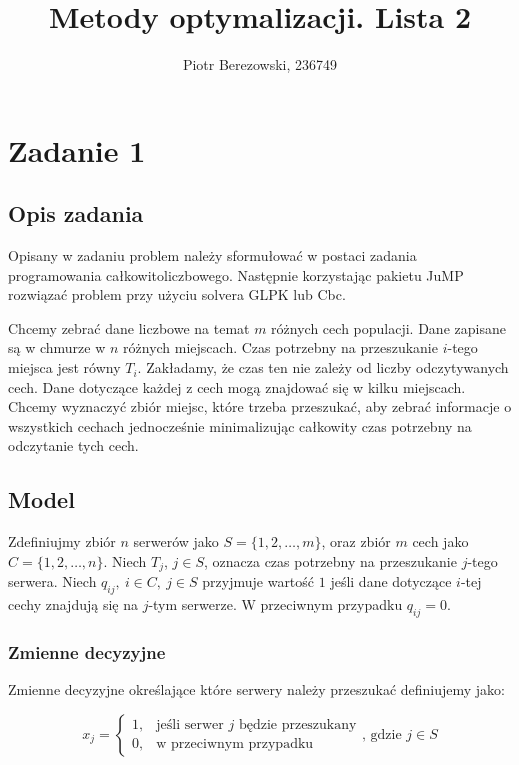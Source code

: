 \documentclass{article}
\title{Metody optymalizacji. Lista 2}
\author{Piotr Berezowski, 236749}
\begin{document}
	\maketitle
	\newpage
	
	\section{Zadanie 1}
	\subsection{Opis zadania}

    Opisany w zadaniu problem należy sformułować w postaci zadania programowania całkowitoliczbowego. Następnie korzystając pakietu JuMP 
    rozwiązać problem przy użyciu solvera GLPK lub Cbc.
    
    Chcemy zebrać dane liczbowe na temat $m$ różnych cech populacji. Dane zapisane są w chmurze w $n$ różnych miejscach. Czas potrzebny na przeszukanie 
    $i$-tego miejsca jest równy $T_i$. Zakładamy, że czas ten nie zależy od liczby odczytywanych cech. Dane dotyczące każdej z cech mogą znajdować się 
    w kilku miejscach. Chcemy wyznaczyć zbiór miejsc, które trzeba przeszukać, aby zebrać informacje o wszystkich cechach jednocześnie minimalizując 
    całkowity czas potrzebny na odczytanie tych cech.

    \subsection{Model}

    Zdefiniujmy zbiór $n$ serwerów jako $S = \{1, 2, \dots, m\}$, oraz zbiór $m$ cech jako $C = \{1, 2, \dots, n\}$. Niech 
    $T_j$, $j \in S$, oznacza czas potrzebny na przeszukanie $j$-tego serwera. Niech $q_{ij}, \ i \in C, \ j \in S$ przyjmuje wartość $1$ 
    jeśli dane dotyczące $i$-tej cechy znajdują się na $j$-tym serwerze. W przeciwnym przypadku $q_{ij} = 0$.

    \subsubsection{Zmienne decyzyjne}

        Zmienne decyzyjne określające które serwery należy przeszukać definiujemy jako:

        \begin{equation*}
            x_{j} =
            \begin{cases}
                1, & \text{jeśli serwer $j$ będzie przeszukany} \\
                0, & \text{w przeciwnym przypadku}
            \end{cases}
            \text{, gdzie $j \in S$}
        \end{equation*}
\end{document}
